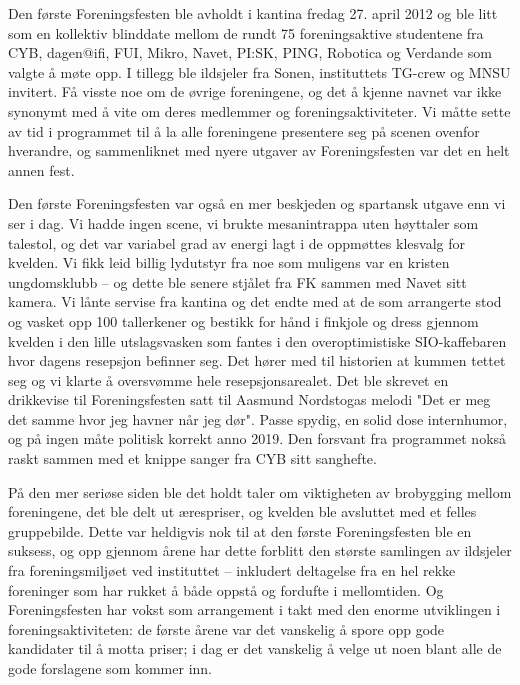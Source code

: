 Den første Foreningsfesten ble avholdt i kantina fredag 27. april 2012 og ble litt som en kollektiv blinddate mellom de rundt 75 foreningsaktive studentene fra CYB, dagen@ifi, FUI, Mikro, Navet, PI:SK, PING, Robotica og Verdande som valgte å møte opp. I tillegg ble ildsjeler fra Sonen, instituttets TG-crew og MNSU invitert. Få visste noe om de øvrige foreningene, og det å kjenne navnet var ikke synonymt med å vite om deres medlemmer og foreningsaktiviteter. Vi måtte sette av tid i programmet til å la alle foreningene presentere seg på scenen ovenfor hverandre, og sammenliknet med nyere utgaver av Foreningsfesten var det en helt annen fest.

Den første Foreningsfesten var også en mer beskjeden og spartansk utgave enn vi ser i dag. Vi hadde ingen scene, vi brukte mesanintrappa uten høyttaler som talestol, og det var variabel grad av energi lagt i de oppmøttes klesvalg for kvelden. Vi fikk leid billig lydutstyr fra noe som muligens var en kristen ungdomsklubb – og dette ble senere stjålet fra FK sammen med Navet sitt kamera. Vi lånte servise fra kantina og det endte med at de som arrangerte stod og vasket opp 100 tallerkener og bestikk for hånd i finkjole og dress gjennom kvelden i den lille utslagsvasken som fantes i den overoptimistiske SIO-kaffebaren hvor dagens resepsjon befinner seg. Det hører med til historien at kummen tettet seg og vi klarte å oversvømme hele resepsjonsarealet. Det ble skrevet en drikkevise til Foreningsfesten satt til Aasmund Nordstogas melodi "Det er meg det samme hvor jeg havner når jeg dør". Passe spydig, en solid dose internhumor, og på ingen måte politisk korrekt anno 2019. Den forsvant fra programmet nokså raskt sammen med et knippe sanger fra CYB sitt sanghefte.

På den mer seriøse siden ble det holdt taler om viktigheten av brobygging mellom foreningene, det ble delt ut ærespriser, og kvelden ble avsluttet med et felles gruppebilde. Dette var heldigvis nok til at den første Foreningsfesten ble en suksess, og opp gjennom årene har dette forblitt den største samlingen av ildsjeler fra foreningsmiljøet ved instituttet – inkludert deltagelse fra en hel rekke foreninger som har rukket å både oppstå og fordufte i mellomtiden. Og Foreningsfesten har vokst som arrangement i takt med den enorme utviklingen i foreningsaktiviteten: de første årene var det vanskelig å spore opp gode kandidater til å motta priser; i dag er det vanskelig å velge ut noen blant alle de gode forslagene som kommer inn.

